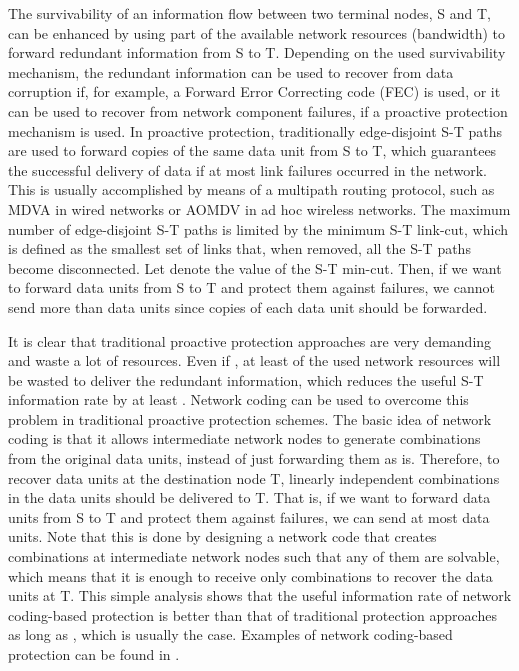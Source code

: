 \documentclass[conference]{IEEEtran}
\begin{document}
The survivability of an information flow between two terminal nodes, S and T, can be enhanced by using part of the available network resources (bandwidth) to forward redundant information from S to T. Depending on the used survivability mechanism, the redundant information can be used to recover from data corruption if, for example, a Forward Error Correcting code (FEC) is used, or it can be used to recover from network component failures, if a proactive protection mechanism is used. In proactive protection, traditionally  edge-disjoint S-T paths are used to forward  copies of the same data unit from S to T, which guarantees the successful delivery of data if at most  link failures occurred in the network. This is usually accomplished by means of a multipath routing protocol, such as MDVA \cite{SJ01} in wired networks or AOMDV \cite{MS01} in ad hoc wireless networks. The maximum number of edge-disjoint S-T paths is limited by the minimum S-T link-cut, which is defined as the smallest set of links that, when removed, all the S-T paths become disconnected. Let  denote the value of the S-T min-cut. Then, if we want to forward data units from S to T and protect them against  failures, we cannot send more than  data units since  copies of each data unit should be forwarded. 

It is clear that traditional proactive protection approaches are very demanding and waste a lot of resources. Even if , at least  of the used network resources will be wasted to deliver the redundant information, which reduces the useful S-T information rate by at least . Network coding \cite{RR00} can be used to overcome this problem in traditional proactive protection schemes. The basic idea of network coding is that it allows intermediate network nodes to generate combinations from the original data units, instead of just forwarding them as is. Therefore, to recover  data units at the destination node T,  linearly independent combinations in the  data units should be delivered to T. That is, if we want to forward data units from S to T and protect them against  failures, we can send at most  data units. Note that this is done by designing a network code that creates  combinations at intermediate network nodes such that any  of them are solvable, which means that it is enough to receive only  combinations to recover the  data units at T. This simple analysis shows that the useful information rate of network coding-based protection is better than that of traditional protection approaches as long as , which is usually the case. Examples of network coding-based protection can be found in \cite{A09,OA09,OA08,AC07}.
\end{document}

